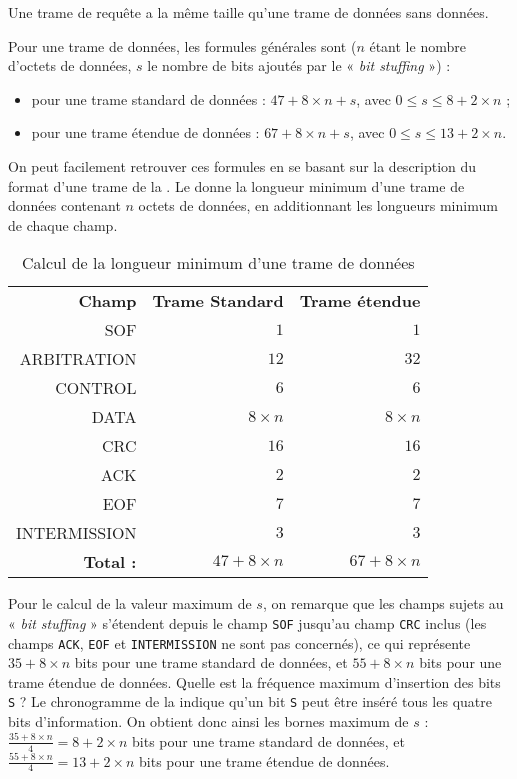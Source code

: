 Une trame de requête a la même taille qu'une trame de données sans données.

Pour une trame de données, les formules générales sont ($n$ étant le nombre d'octets de données, $s$ le nombre de bits ajoutés par le « \emph{bit stuffing} ») :
\begin{itemize}
  \item pour une trame standard de données : $47 + 8 \times n + s$, avec $0 \leqslant s \leqslant 8 + 2 \times n$ ;
  \item pour une trame étendue de données : $67 + 8 \times n + s$, avec $0 \leqslant s \leqslant 13 + 2 \times n$.
\end{itemize}

On peut facilement retrouver ces formules en se basant sur la description du format d'une trame de la . Le  donne la longueur minimum d'une trame de données contenant $n$ octets de données, en additionnant les longueurs minimum de chaque champ.





\begin{table}[!t]
  \small
  \centering
  \begin{tabular}{rrr}
    \textbf{Champ}& \textbf{Trame Standard} & \textbf{Trame étendue} \\
    SOF & $1$ & $1$ \\
    ARBITRATION & $12$ & $32$ \\
    CONTROL & $6$ & $6$ \\
    DATA & $8\times n$ & $8\times n$ \\
    CRC & $16$ & $16$ \\
    ACK & $2$ & $2$ \\
    EOF & $7$ & $7$ \\
    INTERMISSION & $3$ & $3$ \\
    {\bf Total :} & $47 + 8\times n$ & $67 + 8\times n$ \\
   \end{tabular}
  \caption{Calcul de la longueur minimum d'une trame de données}
  \ligne
\end{table}

Pour le calcul de la valeur maximum de $s$, on remarque que les champs sujets au « \emph{bit stuffing} » s'étendent depuis le champ \texttt{SOF} jusqu'au champ \texttt{CRC} inclus (les champs \texttt{ACK}, \texttt{EOF} et \texttt{INTERMISSION} ne sont pas concernés), ce qui représente $35 + 8 \times n$ bits pour une trame standard de données, et $55 + 8 \times n$ bits pour une trame étendue de données. Quelle est la fréquence maximum d'insertion des bits \texttt{S} ? Le chronogramme de la  indique qu'un bit \texttt{S} peut être inséré tous les quatre bits d'information. On obtient donc ainsi les bornes maximum de $s$ : $\frac{35 + 8 \times n}{4} = 8 + 2 \times n$ bits pour une trame standard de données, et $\frac{55 + 8 \times n}{4} = 13 + 2 \times n$ bits pour une trame étendue de données.

